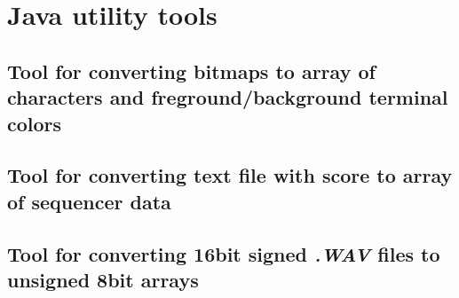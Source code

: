 \section{Java utility tools}

\subsection{Tool for converting bitmaps to array of characters and
freground/background terminal colors}



\subsection{Tool for converting text file with score to array of sequencer data}



\subsection{Tool for converting 16bit signed \emph{.WAV} files to unsigned 8bit
arrays}



